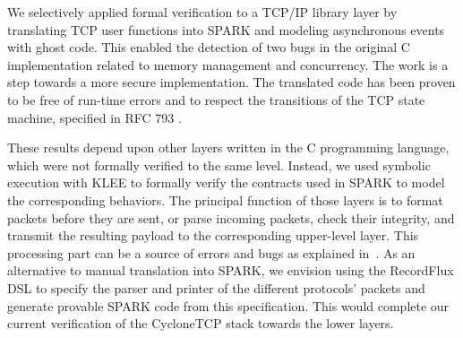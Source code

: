 \documentclass[conference]{IEEEtran}
\begin{document}
We selectively applied formal verification to a TCP/IP library layer by translating TCP user functions into SPARK and modeling asynchronous events with ghost code. This enabled the detection of two bugs in the original C implementation related to memory management and concurrency. The work is a step towards a more secure implementation. The translated code has been proven to be free of run-time errors and to respect the transitions of the TCP state machine, specified in RFC 793 \cite{rfc793}.

These results depend upon other layers written in the C programming language, which were not formally verified to the same level. Instead, we used symbolic execution with KLEE to formally verify the contracts used in SPARK to model the corresponding behaviors. The principal function of those layers is to format packets before they are sent, or parse incoming packets, check their integrity, and transmit the resulting payload to the corresponding upper-level layer. This processing part can be a source of errors and bugs as explained in~\cite{Reiher2019RecordFluxFM}. As an alternative to manual translation into SPARK, we envision using the RecordFlux DSL \cite{Reiher2019RecordFluxFM} to specify the parser and printer of the different protocols' packets and generate provable SPARK code from this specification. This would complete our current verification of the CycloneTCP stack towards the lower layers.






\end{document}
